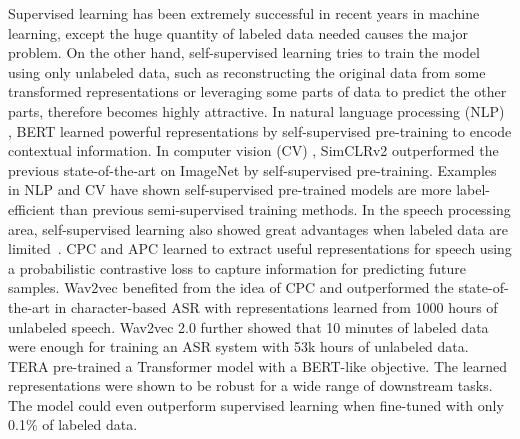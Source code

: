 \documentclass[a4paper]{article}
\begin{document}
Supervised learning has been extremely successful in recent years in machine learning, except the huge quantity of labeled data needed causes the major problem.
On the other hand, self-supervised learning tries to train the model using only unlabeled data, such as reconstructing the original data from some transformed representations or leveraging some parts of data to predict the other parts, therefore becomes highly attractive.
In natural language processing (NLP) \cite{devlin2018bert,peters2018deep,radford2018improving}, BERT \cite{devlin2018bert} learned powerful representations by self-supervised pre-training to encode contextual information.
In computer vision (CV) \cite{chen2020simple,chen2020big,oord2018representation,bachman2019learning,henaff2019data}, SimCLRv2 \cite{chen2020big} outperformed the previous state-of-the-art on ImageNet by self-supervised pre-training.
Examples in NLP and CV have shown self-supervised pre-trained models are more label-efficient than previous semi-supervised training methods.
In the speech processing area, self-supervised learning also showed great advantages when labeled data are limited~\cite{oord2018representation,schneider2019wav2vec,baevski2020wav2vec,chung2016audio,chung2019unsupervised,liu2020mockingjay,liu2020tera}. 
CPC \cite{oord2018representation} and APC \cite{chung2019unsupervised} learned to extract useful representations for speech using a probabilistic contrastive loss to capture information for predicting future samples.
Wav2vec \cite{schneider2019wav2vec} benefited from the idea of CPC and outperformed the state-of-the-art in character-based ASR with representations learned from 1000 hours of unlabeled speech.
Wav2vec 2.0 \cite{baevski2020wav2vec} further showed that 10 minutes of labeled data were enough for training an ASR system with 53k hours of unlabeled data.
TERA \cite{liu2020tera} pre-trained a Transformer model with a BERT-like objective. The learned representations were shown to be robust for a wide range of downstream tasks. The model could even outperform supervised learning when fine-tuned with only 0.1\% of labeled data.
\end{document}
